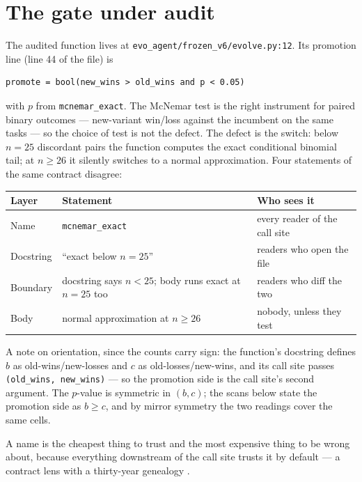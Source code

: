 \documentclass[10pt]{article}
\newcommand{\code}[1]{\texttt{#1}}
\begin{document}
\section{The gate under audit}\label{sec:gate}

The audited function lives at \code{evo\_agent/frozen\_v6/evolve.py:12}. Its
promotion line (line 44 of the file) is

\begin{verbatim}
promote = bool(new_wins > old_wins and p < 0.05)
\end{verbatim}

with $p$ from \code{mcnemar\_exact}. The McNemar test \citep{mcnemar1947} is the
right instrument for paired binary outcomes --- new-variant win/loss against
the incumbent on the same tasks --- so the choice of test is not the defect.
The defect is the switch: below $n{=}25$ discordant pairs the function
computes the exact conditional binomial tail; at $n \ge 26$ it silently
switches to a normal approximation. Four statements of the same contract
disagree:

\begin{center}
\begin{tabular}{lll}
\toprule
Layer & Statement & Who sees it \\
\midrule
Name & \code{mcnemar\_exact} & every reader of the call site \\
Docstring & ``exact below $n{=}25$'' & readers who open the file \\
Boundary & docstring says $n{<}25$; body runs exact at $n{=}25$ too & readers who diff the two \\
Body & normal approximation at $n\ge 26$ & nobody, unless they test \\
\bottomrule
\end{tabular}
\end{center}

\noindent A note on orientation, since the counts carry sign: the function's
docstring defines $b$ as old-wins/new-losses and $c$ as old-losses/new-wins,
and its call site passes \code{(old\_wins, new\_wins)} --- so the promotion
side is the call site's second argument. The $p$-value is symmetric in
$(b,c)$; the scans below state the promotion side as $b \ge c$, and by mirror
symmetry the two readings cover the same cells.

A name is the cheapest thing to trust and the most expensive thing
to be wrong about, because everything downstream of the call site trusts it by
default --- a contract lens with a thirty-year genealogy \citep{meyer1992contract}.
\end{document}
